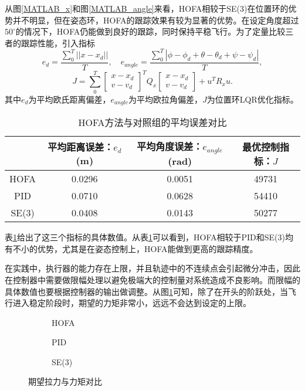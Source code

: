从图\ref{MATLAB_x}和图\ref{MATLAB_angle}来看，HOFA相较于SE(3)在位置环的优势并不明显，但在姿态环，HOFA的跟踪效果有较为显著的优势。在设定角度超过$50^\circ$的情况下，HOFA仍能做到良好的跟踪，同时保持平稳飞行。为了定量比较三者的跟踪性能，引入指标
  $$e_d=\frac{\sum_0^{T}||x-x_d||}{T} ,\quad e_{angle}=\frac{\sum_0^{T}|\phi-\phi_d+\theta-\theta_d+\psi-\psi_d|}{T},$$
  $$J=\sum_0^{T}\begin{bmatrix}
    x-x_d \\ v-v_d
  \end{bmatrix}^T Q_x\begin{bmatrix}
    x-x_d \\ v-v_d
  \end{bmatrix}+u^T R_x u .$$
其中$e_d$为平均欧氏距离偏差，$e_{angle}$为平均欧拉角偏差，$J$为位置环LQR优化指标。

  \begin{table}[!h]
    \centering
    \caption{HOFA方法与对照组的平均误差对比}
    \begin{tabular}{cccc}
        \toprule
        & 平均距离误差：$e_d$ (m)& 平均角度误差：$e_{angle}$ (rad)  & 最优控制指标：$J$ \\
        \midrule
        HOFA & 0.0296 & 0.0051 &49731 \\
        PID & 0.0710 & 0.0628 &54410 \\
        SE(3) &0.0408  &0.0143 &50277 \\
        \bottomrule
    \end{tabular}

    \label{MATLAB对比}
\end{table}
表\ref{MATLAB对比}给出了这三个指标的具体数值。从表\ref{MATLAB对比}可以看到，HOFA相较于PID和SE(3)均有不小的优势，尤其是在姿态控制上，HOFA能做到更高的跟踪精度。

在实践中，执行器的能力存在上限，并且轨迹中的不连续点会引起微分冲击，因此在控制器中需要做限幅处理以避免极端大的控制量对系统造成不良影响。而限幅的具体数值也要根据控制器的输出做调整。从图\ref{MATLAB_fM}可知，除了在开头的阶跃处，当飞行进入稳定阶段时，期望的力矩非常小，远远不会达到设定的上限。
\begin{figure}[!h]
  \centering
  \begin{subfigure}[t]{0.49\textwidth}
    \centering
    \caption{HOFA}
  \end{subfigure}\hfill
  \begin{subfigure}[t]{0.49\textwidth}
    \centering
    \caption{PID}
  \end{subfigure}\hfill
  \begin{subfigure}[t]{0.49\textwidth}
    \centering
    \caption{SE(3)}
  \end{subfigure}
  \caption{期望拉力与力矩对比}
  \label{MATLAB_fM}
\end{figure}

